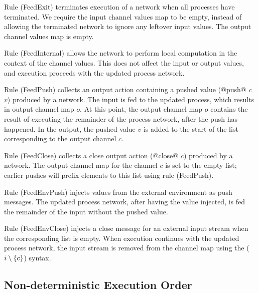 Rule (FeedExit) terminates execution of a network when all processes have terminated.
We require the input channel values map to be empty, instead of allowing the terminated network to ignore any leftover input values.
The output channel values map is empty.

Rule (FeedInternal) allows the network to perform local computation in the context of the channel values.
This does not affect the input or output values, and execution proceeds with the updated process network.

Rule (FeedPush) collects an output action containing a pushed value (@push@ $c$ $v$) produced by a network.
The input is fed to the updated process, which results in output channel map $o$.
At this point, the output channel map $o$ contains the result of executing the remainder of the process network, after the push has happened.
In the output, the pushed value $v$ is added to the start of the list corresponding to the output channel $c$.

Rule (FeedClose) collects a close output action (@close@ $c$) produced by a network.
The output channel map for the channel $c$ is set to the empty list; earlier pushes will prefix elements to this list using rule (FeedPush).

Rule (FeedEnvPush) injects values from the external environment as push messages.
The updated process network, after having the value injected, is fed the remainder of the input without the pushed value.

Rule (FeedEnvClose) injects a close message for an external input stream when the corresponding list is empty.
When execution continues with the updated process network, the input stream is removed from the channel map using the ($i \setminus \{ c \}$) syntax.



\subsection{Non-deterministic Execution Order}
\label{s:EvaluationOrder}

